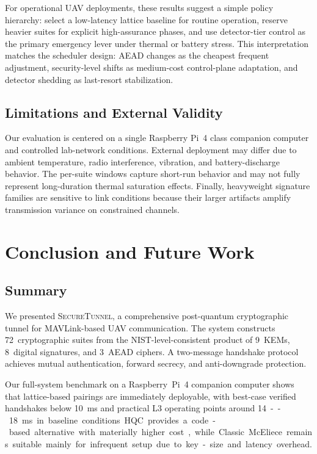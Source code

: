 \documentclass[conference]{IEEEtran}
\newcommand{\sys}{\textsc{SecureTunnel}}
\begin{document}
For operational UAV deployments, these results suggest a simple policy hierarchy: select a low-latency lattice baseline for routine operation, reserve heavier suites for explicit high-assurance phases, and use detector-tier control as the primary emergency lever under thermal or battery stress.
This interpretation matches the scheduler design: AEAD changes as the cheapest frequent adjustment, security-level shifts as medium-cost control-plane adaptation, and detector shedding as last-resort stabilization.

\subsection{Limitations and External Validity}

Our evaluation is centered on a single Raspberry Pi~4 class companion computer and controlled lab-network conditions.
External deployment may differ due to ambient temperature, radio interference, vibration, and battery-discharge behavior.
The per-suite windows capture short-run behavior and may not fully represent long-duration thermal saturation effects.
Finally, heavyweight signature families are sensitive to link conditions because their larger artifacts amplify transmission variance on constrained channels.

\FloatBarrier
\section{Conclusion and Future Work}
\label{sec:conclusion}

\subsection{Summary}

We presented \sys{}, a comprehensive post-quantum cryptographic tunnel for MAVLink-based UAV communication.
The system constructs 72~cryptographic suites from the NIST-level-consistent product of 9~KEMs, 8~digital signatures, and 3~AEAD ciphers.
A two-message handshake protocol achieves mutual authentication, forward secrecy, and anti-downgrade protection.

Our full-system benchmark on a Raspberry~Pi~4 companion computer shows that lattice-based pairings are immediately deployable, with best-case verified handshakes below \SI{10}{\milli\second} and practical L3 operating points around \SI{14}--\SI{18}{\milli\second} in baseline conditions.
HQC provides a code-based alternative with materially higher cost, while Classic McEliece remains suitable mainly for infrequent setup due to key-size and latency overhead.
\end{document}
